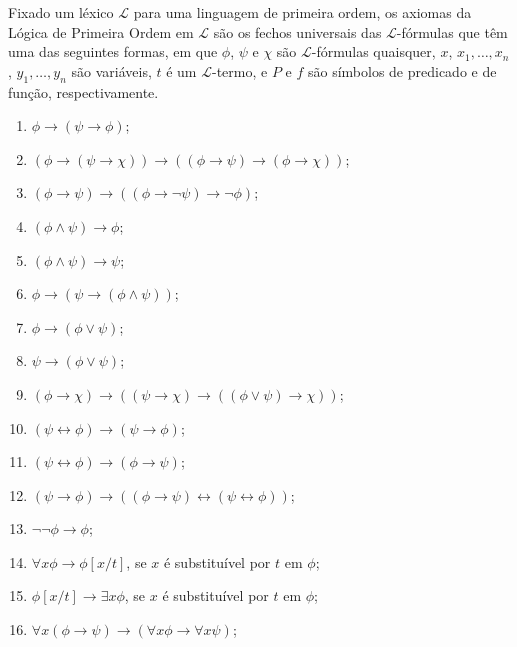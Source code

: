 \begin{metadefinition}\label{mdef:axiomasLogicaPrimeiraOrdem}
    Fixado um léxico $\mathcal L$ para uma linguagem de primeira ordem, os axiomas da Lógica de Primeira Ordem em $\mathcal L$ são os fechos universais das $\mathcal L$-fórmulas que têm uma das seguintes formas, em que $\phi$, $\psi$ e $\chi$ são $\mathcal L$-fórmulas quaisquer, $x$, $x_1,\dots,x_n$, $y_1,\dots,y_n$ são variáveis, $t$ é um $\mathcal L$-termo, e $P$ e $f$ são símbolos de predicado e de função, respectivamente.
    \begin{enumerate}[label=(FO\arabic*), leftmargin=3.2em]
        \item $\phi \rightarrow (\psi \rightarrow \phi)$;
        \item $(\phi \rightarrow (\psi \rightarrow \chi)) \rightarrow ((\phi \rightarrow \psi) \rightarrow (\phi \rightarrow \chi))$;
        \item $(\phi \rightarrow \psi) \rightarrow ((\phi \rightarrow \neg \psi) \rightarrow \neg \phi)$;
        \item $(\phi \land \psi) \rightarrow \phi$;
        \item $(\phi \land \psi) \rightarrow \psi$;
        \item $\phi \rightarrow (\psi \rightarrow (\phi \land \psi))$;
        \item $\phi \rightarrow (\phi \lor \psi)$;
        \item $\psi \rightarrow (\phi \lor \psi)$;
        \item $(\phi \rightarrow \chi) \rightarrow ((\psi \rightarrow \chi) \rightarrow ((\phi \lor \psi) \rightarrow \chi))$;
        \item $(\psi \leftrightarrow \phi) \rightarrow (\psi \rightarrow \phi)$;
        \item $(\psi \leftrightarrow \phi) \rightarrow (\phi \rightarrow \psi)$;
        \item $(\psi \rightarrow \phi) \rightarrow ((\phi \rightarrow \psi) \leftrightarrow (\psi \leftrightarrow \phi))$;
        \item $\neg \neg \phi \rightarrow \phi$;
        \item $\forall x \phi \rightarrow \phi[x/t]$, se $x$ é substituível por $t$ em $\phi$;
        \item $\phi[x/t] \rightarrow \exists x \phi$, se $x$ é substituível por $t$ em $\phi$;
        \item $\forall x(\phi\rightarrow\psi)\rightarrow(\forall x\phi\rightarrow\forall x\psi)$;

\end{enumerate}
\end{metadefinition}
